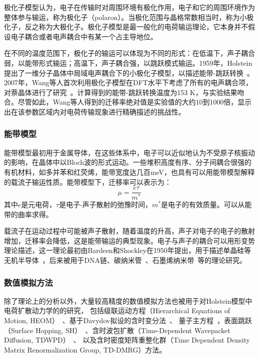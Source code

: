 \documentclass{article}
\begin{document}
极化子模型认为，电子在传输时对周围环境有极化作用，电子和它的周围环境作为整体参与输运，称为极化子（polaron）。当极化范围与晶格常数相当时，称为小极化子，反之称为大极化子。极化子模型是最一般化的电荷输运理论，它本身并不假设电子耦合或者电声耦合中有某一个占主导地位。

在不同的温度范围下，极化子的输运可以体现为不同的形式：在低温下，声子耦合弱，以能带形式输运；高温下，声子耦合强，以跳跃模式输运。1959年，Holstein提出了一维分子晶体中局域电声耦合下的小极化子模型，以描述能带-跳跃转换~\cite{HOLST59}。2007年，Wang等人首次利用极化子模型在DFT水平下考虑了所有的电声耦合项，对萘晶体进行了研究~\cite{WANG07, WANG08}。计算得到的能带-跳跃转换温度为153 K，与实验结果吻合。尽管如此，Wang等人得到的迁移率绝对值是实验值的大约10到1000倍，显示出在该参数区域内对电荷传输现象进行精确描述的挑战性。

\subsubsection{能带模型}
能带模型最初用于金属导体，在这些体系中，电子可以近似地认为不受原子核振动的影响，在晶体中以Bloch波的形式运动。一些堆积高度有序、分子间耦合很强的有机材料，如多并苯和红荧烯，能带宽度达几百meV，也具有可以用能带模型解释的载流子输运性质。能带模型下，迁移率可以表示为：
\begin{equation}
\mu=\frac{e\tau}{m^*}
\end{equation}
其中$e$是元电荷，$\tau$是电子-声子散射的弛豫时间，$m^*$是电子的有效质量。可以从能带的曲率求得。

载流子在运动过程中可能被声子散射，随着温度的升高，声子对电子的电子的散射增加，迁移率会降低，这是能带输运的典型现象。电子与声子的耦合可以用形变势理论描述，这一理论最初由Bardeen和Shockley在1950年提出，用于描述单晶硅等无机半导体~\cite{BARD50}，后来被用于DNA链\cite{LADIK66}、碳纳米管~\cite{SA08}、石墨烯纳米带~\cite{LONG09}等的理论研究。

\subsubsection{数值模拟方法}
除了理论上的分析以外，大量较高精度的数值模拟方法也被用于对Holstein模型中电荷扩散动力学的的研究，
包括级联运动方程（Hierarchical Equations of Motion, HEOM）~\cite{Chen15}、基于Davydov拟设的含时变分法~\cite{Yang10}、
量子主方程~\cite{Wang10}，表面跳跃（Surface Hopping, SH）~\cite{Wang15}、含时波包扩散（Time-Dependent Wavepacket Diffusion, TDWPD）~\cite{Jiang16}、
以及含时密度矩阵重整化群（Time Dependent Density Matrix Renormalization Group, TD-DMRG）方法\cite{Yao17}。
\end{document}
